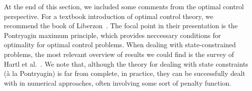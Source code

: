\documentclass[a4paper]{report}
\theoremstyle{definition}
\theoremstyle{plain}
\newtheorem{remarknum}{Remark}[chapter]
\newcommand*\diff{\mathop{}\!\mathrm{d}}
\begin{document}
At the end of this section, we included some comments from the optimal control
perspective. For a textbook introduction of optimal control theory, we recommend
the book of Liberzon~\cite{liberzonCalculusVariationsOptimal}. The focal point
in their presentation is the Pontryagin maximum principle, which provides
neccessary conditions for optimality for optimal control problems.
%
When dealing with state-constrained problems, the most relevant overview of
results we could find is the survey of Hartl et
al.~\cite{hartlSurveyMaximumPrinciples1995}.
%
We note that, although the theory for dealing with state constraints (\`a la
Pontryagin) is far from complete, in practice, they can be successfully dealt
with in numerical approaches, often involving some sort of penalty function.

\end{document}
